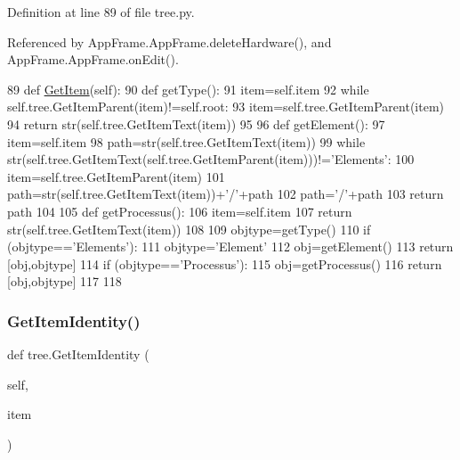 Definition at line 89 of file tree.\+py.



Referenced by App\+Frame.\+App\+Frame.\+delete\+Hardware(), and App\+Frame.\+App\+Frame.\+on\+Edit().


\begin{DoxyCode}
89     \textcolor{keyword}{def }\hyperlink{namespacetree_a2d9ace69c820aa1a47a130d6f2563dd5}{GetItem}(self):
90         \textcolor{keyword}{def }getType():
91             item=self.item
92             \textcolor{keywordflow}{while} self.tree.GetItemParent(item)!=self.root:
93                 item=self.tree.GetItemParent(item)
94             \textcolor{keywordflow}{return} str(self.tree.GetItemText(item))
95 
96         \textcolor{keyword}{def }getElement():
97             item=self.item
98             path=str(self.tree.GetItemText(item))
99             \textcolor{keywordflow}{while} str(self.tree.GetItemText(self.tree.GetItemParent(item)))!=\textcolor{stringliteral}{'Elements'}:
100                 item=self.tree.GetItemParent(item)
101                 path=str(self.tree.GetItemText(item))+\textcolor{stringliteral}{'/'}+path
102             path=\textcolor{stringliteral}{'/'}+path
103             \textcolor{keywordflow}{return} path
104 
105         \textcolor{keyword}{def }getProcessus():
106             item=self.item
107             \textcolor{keywordflow}{return} str(self.tree.GetItemText(item))
108 
109         objtype=getType()
110         \textcolor{keywordflow}{if} (objtype==\textcolor{stringliteral}{'Elements'}):
111             objtype=\textcolor{stringliteral}{'Element'}
112             obj=getElement()        
113             \textcolor{keywordflow}{return} [obj,objtype]
114         \textcolor{keywordflow}{if} (objtype==\textcolor{stringliteral}{'Processus'}):
115             obj=getProcessus()
116             \textcolor{keywordflow}{return} [obj,objtype]
117 
118 
\end{DoxyCode}
\mbox{\label{namespacetree_a0aa735bae0dc8e20d0aecaba52fc2754}} 
\subsubsection{\texorpdfstring{Get\+Item\+Identity()}{GetItemIdentity()}}
{\footnotesize\ttfamily def tree.\+Get\+Item\+Identity (\begin{DoxyParamCaption}\item[{}]{self,  }\item[{}]{item }\end{DoxyParamCaption})}



